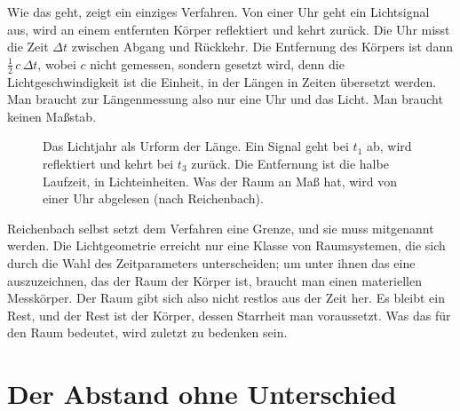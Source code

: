 Wie das geht, zeigt ein einziges Verfahren. Von einer Uhr geht ein Lichtsignal aus, wird an einem entfernten Körper reflektiert und kehrt zurück. Die Uhr misst die Zeit $\Delta t$ zwischen Abgang und Rückkehr. Die Entfernung des Körpers ist dann $\tfrac12\, c\, \Delta t$, wobei $c$ nicht gemessen, sondern gesetzt wird, denn die Lichtgeschwindigkeit ist die Einheit, in der Längen in Zeiten übersetzt werden. Man braucht zur Längenmessung also nur eine Uhr und das Licht. Man braucht keinen Maßstab.

\begin{figure}[htbp]
\centering
{}
\caption{Das Lichtjahr als Urform der Länge. Ein Signal geht bei $t_1$ ab, wird reflektiert und kehrt bei $t_3$ zurück. Die Entfernung ist die halbe Laufzeit, in Lichteinheiten. Was der Raum an Maß hat, wird von einer Uhr abgelesen (nach Reichenbach).}
\label{abb:lichtjahr}
\end{figure}

Reichenbach selbst setzt dem Verfahren eine Grenze, und sie muss mitgenannt werden. Die Lichtgeometrie erreicht nur eine Klasse von Raumsystemen, die sich durch die Wahl des Zeitparameters unterscheiden; um unter ihnen das eine auszuzeichnen, das der Raum der Körper ist, braucht man einen materiellen Messkörper. Der Raum gibt sich also nicht restlos aus der Zeit her. Es bleibt ein Rest, und der Rest ist der Körper, dessen Starrheit man voraussetzt. Was das für den Raum bedeutet, wird zuletzt zu bedenken sein.

\section{Der Abstand ohne Unterschied}

